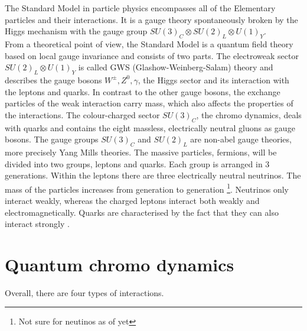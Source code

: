 The Standard Model in particle physics encompasses all of the
Elementary particles and their interactions. It is a gauge theory spontaneously broken by the Higgs mechanism with the gauge group $ SU(3)_C \otimes SU(2)_L \otimes U(1)_Y $.\\
From a theoretical point of view, the Standard Model is a quantum field theory based on local gauge invariance and consists of two parts. The electroweak sector $ SU(2)_L \otimes U(1)_Y $ is called GWS (Glashow-Weinberg-Salam) theory and describes the gauge bosons $ W^{\pm}, Z^0, \gamma $, the Higgs sector and its interaction with the leptons and quarks. In contrast to the other gauge bosons, the exchange particles of the weak interaction carry mass, which also affects the properties of the interactions. The colour-charged sector $ SU(3)_C $, the chromo dynamics, deals with quarks and contains the eight massless, electrically neutral gluons as gauge bosons. The gauge groups $SU(3)_C$ and $SU(2)_L$ are 
non-abel gauge theories, more precisely Yang Mills theories.
The massive particles, fermions, will be divided into two groups, leptons and quarks. Each group is arranged in 3 generations. Within the leptons there are three electrically neutral neutrinos. The mass of the particles increases from generation to generation \footnote{Not sure for neutinos as of yet}. Neutrinos only interact weakly, whereas the charged leptons interact both weakly and electromagnetically. Quarks are characterised by the fact that they can also interact strongly \cite{edelhaeuser2016tutorium}. 

\section{Quantum chromo dynamics}

Overall, there are four types of interactions.\\



